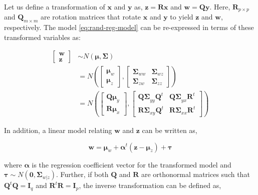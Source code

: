 \documentclass[num-refs]{wiley-article}
\begin{document}
Let us define a transformation of \(\mathbf{x}\) and \(\mathbf{y}\) as,
\(\mathbf{z} = \mathbf{Rx}\) and \(\mathbf{w} = \mathbf{Qy}\). Here,
\(\mathbf{R}_{p\times p}\) and \(\mathbf{Q}_{m\times m}\) are rotation
matrices that rotate \(\mathbf{x}\) and \(\mathbf{y}\) to yield
\(\mathbf{z}\) and \(\mathbf{w}\), respectively. The model
\eqref{eq:rand-reg-model} can be re-expressed in terms of these
transformed variables as:

\begin{align}
  \begin{bmatrix}\mathbf{w} \\ 
  \mathbf{z}\end{bmatrix}  & \sim N \left(\boldsymbol{\mu}, \boldsymbol{\Sigma}\right) \\
  &= N \left(
    \begin{bmatrix}
      \boldsymbol{\mu}_w \\ \boldsymbol{\mu}_z
    \end{bmatrix},
    \begin{bmatrix}
      \boldsymbol{\Sigma}_{ww} & \boldsymbol{\Sigma}_{wz} \\
      \boldsymbol{\Sigma}_{zw} & \boldsymbol{\Sigma}_{zz}
    \end{bmatrix} \right) \nonumber \\
  &= N \left(
    \begin{bmatrix}
      \boldsymbol{Q\mu}_y \\
      \boldsymbol{R\mu}_x
    \end{bmatrix},
    \begin{bmatrix}
      \boldsymbol{Q\Sigma}_{yy}\boldsymbol{Q}^t & \boldsymbol{Q\Sigma}_{yx}\mathbf{R}^t \\
      \boldsymbol{R\Sigma}_{xy}\boldsymbol{Q}^t & \boldsymbol{R\Sigma}_{xx}\mathbf{R}^t
    \end{bmatrix}
  \right)
  \label{eq:model3}
\end{align}

In addition, a linear model relating \(\mathbf{w}\) and \(\mathbf{z}\)
can be written as,

\begin{equation}
\mathbf{w} =    \boldsymbol{\mu}_w + \boldsymbol{\alpha}^t \left(\mathbf{z} - \boldsymbol{\mu}_z\right) + \boldsymbol{\tau}
\label{eq:latent-model}
\end{equation}

where \(\boldsymbol{\alpha}\) is the regression coefficient vector for
the transformed model and
\(\boldsymbol{\tau} \sim N\left(\mathbf{0}, \boldsymbol{\Sigma}_{w|z}\right)\).
Further, if both \(\mathbf{Q}\) and \(\mathbf{R}\) are orthonormal
matrices such that \(\mathbf{Q}^t\mathbf{Q} = \mathbf{I}_q\) and
\(\mathbf{R}^t\mathbf{R} = \mathbf{I}_p\), the inverse transformation
can be defined as,
\end{document}
